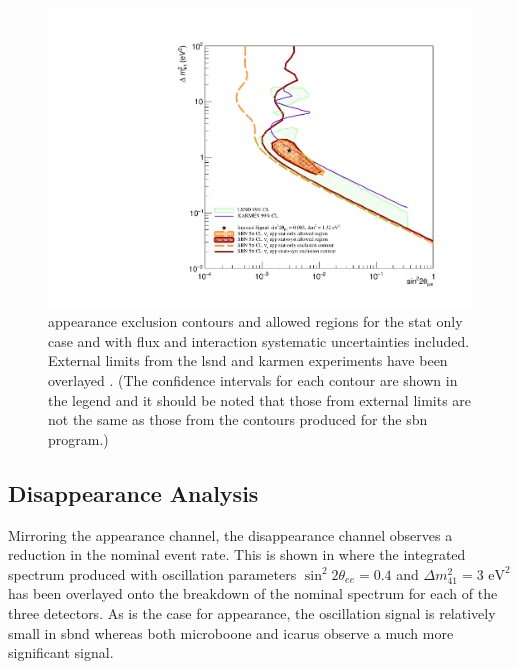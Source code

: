 \begin{figure}[h!]
    \centering
    \includegraphics[width = \largefigwidth]{figures-chap6/overlays/valor_overlays_nue_app.pdf}
    \caption[\nue appearance contours with external limits.]{\nue appearance exclusion contours and allowed regions for the stat only case and with flux and interaction systematic uncertainties included. External limits from the \gls{lsnd} and \gls{karmen} experiments have been overlayed \cite{LSND_KARMEN_nue_app_contour}. (The confidence intervals for each contour are shown in the legend and it should be noted that those from external limits are not the same as those from the contours produced for the \gls{sbn} program.)}
    \label{fig:nue_app_global_sensitivity}
\end{figure}


\clearpage
\subsection{\texorpdfstring{\nue Disappearance Analysis}{nue Disappearance Analysis}}

Mirroring the \nue appearance channel, the \nue disappearance channel observes a reduction in the nominal \nue event rate. This is shown in  where the integrated spectrum produced with oscillation parameters $\sin^2{2\theta_{ee}} = 0.4$ and $\Delta m^2_{41} = 3 \text{ eV}^2$ has been overlayed onto the breakdown of the nominal spectrum for each of the three detectors. As is the case for \nue appearance, the oscillation signal is relatively small in \gls{sbnd} whereas both \gls{microboone} and \gls{icarus} observe a much more significant signal. 

